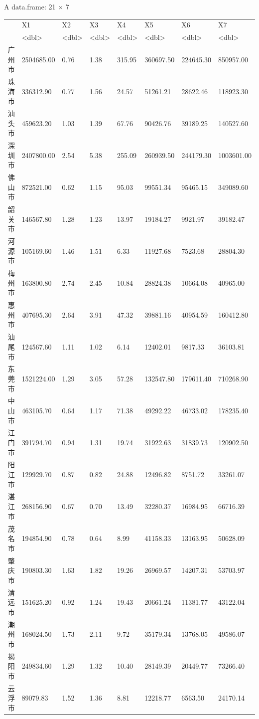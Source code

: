 \documentclass[UTF8,a4paper]{ctexart}
\begin{document}
    A data.frame: 21 × 7
\begin{tabular}{r|lllllll}
  & X1 & X2 & X3 & X4 & X5 & X6 & X7\\
  & <dbl> & <dbl> & <dbl> & <dbl> & <dbl> & <dbl> & <dbl>\\
\hline
	广州市 & 2504685.00 & 0.76 & 1.38 & 315.95 & 360697.50 & 224645.30 &  850957.00\\
	珠海市 &  336312.90 & 0.77 & 1.56 &  24.57 &  51261.21 &  28622.46 &  118923.30\\
	汕头市 &  459623.20 & 1.03 & 1.39 &  67.76 &  90426.76 &  39189.25 &  140527.60\\
	深圳市 & 2407800.00 & 2.54 & 5.38 & 255.09 & 260939.50 & 244179.30 & 1003601.00\\
	佛山市 &  872521.00 & 0.62 & 1.15 &  95.03 &  99551.34 &  95465.15 &  349089.60\\
	韶关市 &  146567.80 & 1.28 & 1.23 &  13.97 &  19184.27 &   9921.97 &   39182.47\\
	河源市 &  105169.60 & 1.46 & 1.51 &   6.33 &  11927.68 &   7523.68 &   28804.30\\
	梅州市 &  163800.80 & 2.74 & 2.45 &  10.84 &  28824.38 &  10664.08 &   40965.00\\
	惠州市 &  407695.30 & 2.64 & 3.91 &  47.32 &  39881.16 &  40954.59 &  160412.80\\
	汕尾市 &  124567.60 & 1.11 & 1.02 &   6.14 &  12402.01 &   9817.33 &   36103.81\\
	东莞市 & 1521224.00 & 1.29 & 3.05 &  57.28 & 132547.80 & 179611.40 &  710268.90\\
	中山市 &  463105.70 & 0.64 & 1.17 &  71.38 &  49292.22 &  46733.02 &  178235.40\\
	江门市 &  391794.70 & 0.94 & 1.31 &  19.74 &  31922.63 &  31839.73 &  120902.50\\
	阳江市 &  129929.70 & 0.87 & 0.82 &  24.88 &  12496.82 &   8751.72 &   33261.07\\
	湛江市 &  268156.90 & 0.67 & 0.70 &  13.49 &  32280.37 &  16984.95 &   66716.39\\
	茂名市 &  194854.90 & 0.78 & 0.64 &   8.99 &  41158.33 &  13163.95 &   50628.09\\
	肇庆市 &  190803.30 & 1.63 & 1.82 &  19.26 &  26969.57 &  14207.31 &   53703.97\\
	清远市 &  151625.20 & 0.92 & 1.24 &  19.43 &  20661.24 &  11381.77 &   43122.04\\
	潮州市 &  168024.50 & 1.73 & 2.11 &   9.72 &  35179.34 &  13768.05 &   49586.07\\
	揭阳市 &  249834.60 & 1.29 & 1.32 &  10.40 &  28149.39 &  20449.77 &   73266.40\\
	云浮市 &   89079.83 & 1.52 & 1.36 &   8.81 &  12218.77 &   6563.50 &   24170.14\\
\end{tabular}
\end{document}
